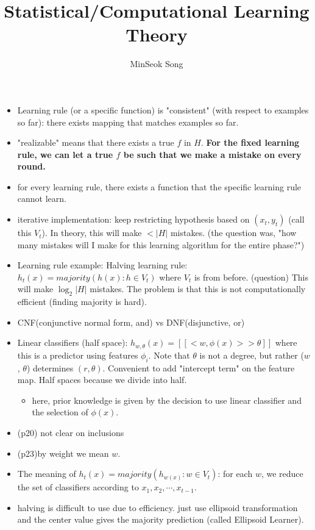 \documentclass{article}
\title{Statistical/Computational Learning Theory}
\author{MinSeok Song}
\date{}
\theoremstyle{remark}
\begin{document}
\maketitle 
\begin{itemize}

\item Learning rule (or a specific function) is "consistent" (with respect to examples so far): there exists mapping that matches examples so far.
\item "realizable" means that there exists a true $f$ in $H$. \textbf{For the fixed learning rule, we can let a true $f$ be such that we make a mistake on every round.}
\item for every learning rule, there exists a function that the specific learning rule cannot learn.
\item iterative implementation: keep restricting hypothesis based on $(x_t,y_t)$ (call this $V_t$). In theory, this will make $<\lvert H\rvert$ mistakes. (the question was, "how many mistakes will I make for this learning algorithm for the entire phase?")

\item Learning rule example: Halving learning rule: $h_t (x)=majority(h(x):h\in V_t)$ where $V_t$ is from before. (question) 
This will make $\log_2\lvert H\rvert$ mistakes. The problem is that this is not computationally efficient (finding majority is hard).
\item CNF(conjunctive normal form, and) vs DNF(disjunctive, or)

\item Linear classifiers (half space): $h_{w,\theta}(x)=[[<w,\phi(x)>>\theta]]$ where this is a predictor using features $\phi_i$. Note that $\theta$ is not a degree, but rather ($w$, $\theta$) determines $(r,\theta)$. Convenient to add "intercept term" on the feature map. Half spaces because we divide into half.
\begin{itemize}
\item here, prior knowledge is given by the decision to use linear classifier and the selection of $\phi(x)$.
\end{itemize}
\item (p20) not clear on inclusions
\item (p23)by weight we mean $w$.
\item The meaning of $h_t (x)=majority(h_{w(x)}:w\in V_t)$: for each $w$, we reduce the set of classifiers according to $x_1,x_2,\cdots,x_{t-1}$.

\item halving is difficult to use due to efficiency. just use ellipsoid transformation and the center value gives the majority prediction (called Ellipsoid Learner).

\end{itemize}
\end{document}
